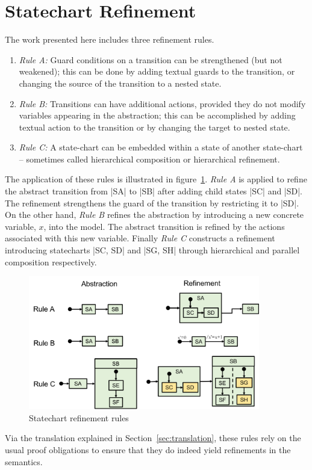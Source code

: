 \section{Statechart Refinement}
\label{sec:refinement-rules}

The work presented here includes three refinement rules.
\begin{enumerate}
\item  \emph{Rule A:} Guard conditions on a transition can be strengthened (but not weakened); 
this can be done by adding textual guards to the transition, or
changing the source of the transition to a nested state.
\item \emph{Rule B:} Transitions can have additional actions, provided they do not
  modify variables appearing in the abstraction; this can be 
  accomplished by adding textual action to the transition 
  or by changing the target to nested state.
\item \emph{Rule C:} A state-chart can be embedded within a state of another
  state-chart -- sometimes called hierarchical composition or
  hierarchical refinement.
\end{enumerate}

The application of these rules is illustrated in figure~\ref{fig:ref-rules}.
\emph{Rule A} is applied to refine the abstract transition from |SA| to |SB| after adding 
child states |SC| and |SD|. The refinement strengthens the guard of the transition 
by restricting it to |SD|. On the other hand, \emph{Rule B} refines the abstraction 
by introducing a new concrete variable, $x$, into the model. The abstract transition is refined 
by the actions associated with this new variable. Finally \emph{Rule C} constructs a refinement 
introducing statecharts |SC, SD| and |SG, SH| through hierarchical and parallel composition respectively.

\begin{figure}[]
	\centering
	\includegraphics[width=0.90\textwidth]{figures/RefinementRules.png}
	\caption{Statechart refinement rules}
	\label{fig:ref-rules}
\end{figure} 

Via the translation explained in Section~\ref{sec:translation}, these
rules rely on the usual \EventB proof obligations to ensure that they
do indeed yield refinements in the \EventB semantics.